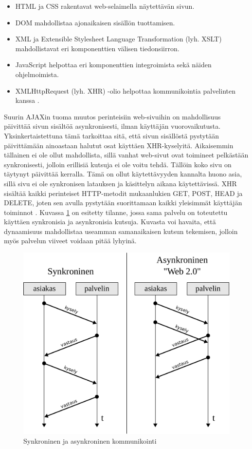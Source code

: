 \begin{itemize}
\item HTML ja CSS rakentavat web-selaimella näytettävän sivun.
\item DOM mahdollistaa ajonaikaisen sisällön tuottamisen.
\item XML ja Extensible Stylesheet Language Transformation (lyh. XSLT)
  mahdollistavat eri komponenttien välisen tiedonsiirron.
\item JavaScript helpottaa eri komponenttien integroimista sekä näiden
  ohjelmoimista.
\item XMLHttpRequest (lyh. XHR) -olio helpottaa kommunikointia
  palvelinten kanssa \cite{WEB2b}.
\end{itemize}

Suurin AJAXin tuoma muutos perinteisiin web-sivuihin on mahdollisuus päivittää sivun sisältöä asynkronisesti, ilman käyttäjän vuorovaikutusta. Yksinkertaistettuna tämä tarkoittaa sitä,
että sivun sisällöstä pystytään päivittämään ainoastaan halutut osat käyttäen XHR-kyselyitä. Aikaisemmin tällainen ei ole ollut mahdollista, sillä vanhat web-sivut ovat toimineet 
pelkästään synkronisesti, jolloin erillisiä kutsuja ei ole voitu tehdä. Tällöin koko sivu on täytynyt päivittää kerralla. Tämä on ollut käytettävyyden kannalta huono asia,
sillä sivu ei ole synkronisen latauksen ja käsittelyn aikana käytettävissä. XHR sisältää kaikki perinteiset HTTP-metodit mukaanlukien GET, POST, HEAD ja DELETE, joten sen avulla 
pystytään suorittamaan kaikki yleisimmät käyttäjän toiminnot \cite{WEB2}. Kuvassa \ref{synkroninen} on esitetty tilanne, jossa sama palvelu on toteutettu käyttäen synkronisia ja 
asynkronisia kutsuja. Kuvasta voi havaita, että dynaamisuus mahdollistaa useamman samanaikaisen kutsun tekemisen, jolloin myös palvelun viiveet voidaan pitää lyhyinä.

\begin{figure}[htp]
\centering
\includegraphics[width=11.5cm]{pics/synkroninen.pdf}
\caption{Synkroninen ja asynkroninen kommunikointi}
\label{synkroninen}
\end{figure}

